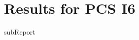 \renewcommand{\DTRPcs}{I6} %
\renewcommand{\DTRPcsLong}{I6}


    \section{Results for PCS \DTRPcsLong}

    {{subReport}}
    \newpage

